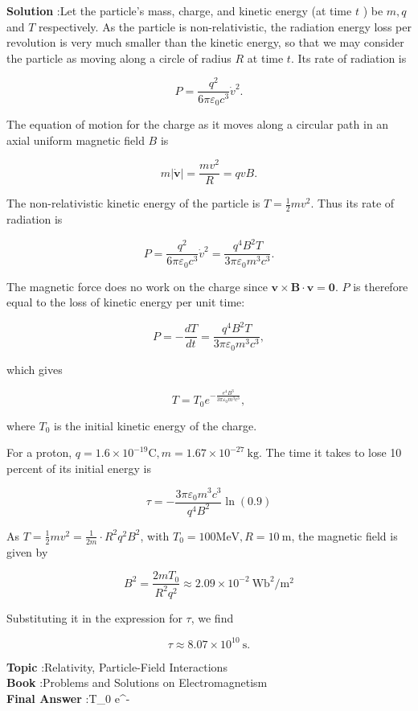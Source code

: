 \documentclass[10pt]{article}
\begin{document}
\textbf{Solution} :Let the particle's mass, charge, and kinetic energy (at time $t$ ) be $m, q$ and $T$ respectively. As the particle is non-relativistic, the radiation energy loss per revolution is very much smaller than the kinetic energy, so that we may consider the particle as moving along a circle of radius $R$ at time $t$. Its rate of radiation is

$$
P=\frac{q^{2}}{6 \pi \varepsilon_{0} c^{3}} \dot{v}^{2} .
$$

The equation of motion for the charge as it moves along a circular path in an axial uniform magnetic field $B$ is

$$
m|\dot{\mathbf{v}}|=\frac{m v^{2}}{R}=q v B .
$$

The non-relativistic kinetic energy of the particle is $T=\frac{1}{2} m v^{2}$. Thus its rate of radiation is

$$
P=\frac{q^{2}}{6 \pi \varepsilon_{0} c^{3}} \dot{v}^{2}=\frac{q^{4} B^{2} T}{3 \pi \varepsilon_{0} m^{3} c^{3}} .
$$

The magnetic force does no work on the charge since $\mathbf{v} \times \mathbf{B} \cdot \mathbf{v}=\mathbf{0}$. $P$ is therefore equal to the loss of kinetic energy per unit time:

$$
P=-\frac{d T}{d t}=\frac{q^{4} B^{2} T}{3 \pi \varepsilon_{0} m^{3} c^{3}},
$$

which gives

$$
T=T_{0} e^{-\frac{e^{4} B^{3}}{3 \pi \varepsilon_{0} m^{3} c^{3}}},
$$

where $T_{0}$ is the initial kinetic energy of the charge.

 For a proton, $q=1.6 \times 10^{-19} \mathrm{C}, m=1.67 \times 10^{-27} \mathrm{~kg}$. The time it takes to lose 10 percent of its initial energy is

$$
\tau=-\frac{3 \pi \varepsilon_{0} m^{3} c^{3}}{q^{4} B^{2}} \ln (0.9)
$$

As $T=\frac{1}{2} m v^{2}=\frac{1}{2 m} \cdot R^{2} q^{2} B^{2}$, with $T_{0}=100 \mathrm{MeV}, R=10 \mathrm{~m}$, the magnetic field is given by

$$
B^{2}=\frac{2 m T_{0}}{R^{2} q^{2}} \approx 2.09 \times 10^{-2} \mathrm{~Wb}^{2} / \mathrm{m}^{2}
$$

Substituting it in the expression for $\tau$, we find

$$
\tau \approx 8.07 \times 10^{10} \mathrm{~s} .
$$

\textbf{Topic} :Relativity, Particle-Field Interactions\\
\textbf{Book} :Problems and Solutions on Electromagnetism\\
\textbf{Final Answer} :T_{0} e^{-}\\
\end{document}
